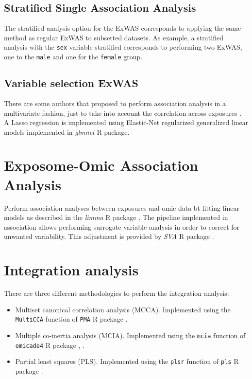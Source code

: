 \documentclass[
]{book}
\providecommand{\tightlist}{%
  \setlength{\itemsep}{0pt}\setlength{\parskip}{0pt}}
\begin{document}
\hypertarget{stratified-single-association-analysis}{%
\subsection{Stratified Single Association Analysis}\label{stratified-single-association-analysis}}

The stratified analysis option for the ExWAS corresponds to applying the same method as regular ExWAS to subsetted datasets. As example, a stratified analysis with the \texttt{sex} variable stratified corresponds to performing two ExWAS, one to the \texttt{male} and one for the \texttt{female} group.

\hypertarget{variable-selection-exwas-1}{%
\subsection{Variable selection ExWAS}\label{variable-selection-exwas-1}}

There are some authors that proposed to perform association analysis in a multivariate fashion, just to take into account the correlation across exposures \citet{agier2016systematic} . A Lasso regression is implemented using Elastic-Net regularized generalized linear models implemented in \emph{glmnet} R package.

\hypertarget{exposome-omic-association-analysis}{%
\section{Exposome-Omic Association Analysis}\label{exposome-omic-association-analysis}}

Perform association analyses between exposures and omic data bt fitting linear models as described in the \emph{limma} R package \citet{ritchie2015limma} . The pipeline implemented in association allows performing surrogate variable analysis in order to correct for unwanted variability. This adjustment is provided by \emph{SVA} R package \citet{sva} .

\hypertarget{integration-analysis}{%
\section{Integration analysis}\label{integration-analysis}}

There are three different methodologies to perform the integration analysis:

\begin{itemize}
\tightlist
\item
  Multiset canonical correlation analysis (MCCA). Implemented using the \texttt{MultiCCA} function of \texttt{PMA} R package \citet{witten2020package} .
\item
  Multiple co-inertia analysis (MCIA). Implemented using the \texttt{mcia} function of \texttt{omicade4} R package \citet{mcia} , \citet{min2020sparse} .
\item
  Partial least squares (PLS). Implemented using the \texttt{plsr} function of \texttt{pls} R package \citet{mevik2015introduction} .
\end{itemize}
\end{document}
